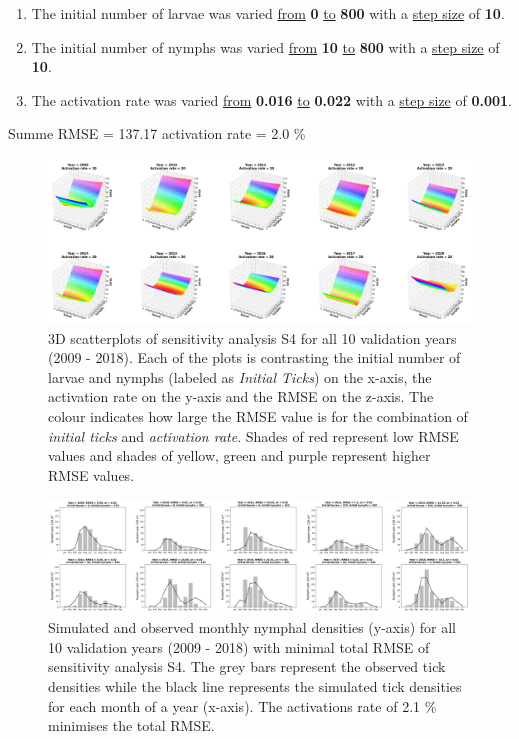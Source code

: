 \documentclass[a4paper, 11pt]{scrartcl}
\begin{document}
\begin{enumerate}
\item The initial number of larvae was varied \underline{from} \textbf{0} \underline{to} \textbf{800} with a \underline{step size} of \textbf{10}.
\item The initial number of nymphs was varied \underline{from} \textbf{10} \underline{to} \textbf{800} with a \underline{step size} of \textbf{10}.
\item The activation rate was varied \underline{from} \textbf{0.016} \underline{to} \textbf{0.022} with a \underline{step size} of \textbf{0.001}.
\end{enumerate}

Summe RMSE = 137.17
activation rate = 2.0 \%

\begin{figure}[h!]
\centering
\includegraphics[width=\linewidth]{figures/independent_initial_ticks_without_beech_error.png}
\caption{3D scatterplots of sensitivity analysis S4 for all 10 validation years (2009 - 2018). Each of the plots is contrasting the initial number of larvae and nymphs
(labeled as \textit{Initial Ticks}) on the x-axis, the activation rate on the y-axis and the RMSE on the z-axis. The colour indicates how large the RMSE value is for the
combination of \textit{initial ticks} and \textit{activation rate}. Shades of red represent low RMSE values and shades of yellow, green and purple represent higher RMSE values.}
\label{fig:independent_initial_ticks_without_beech_error}
\end{figure}

\begin{figure}[h!]
\centering
\includegraphics[width=\linewidth]{figures/independent_initial_ticks_without_beech.png}
\caption{Simulated and observed monthly nymphal densities (y-axis) for all 10 validation years (2009 - 2018) with minimal total RMSE of sensitivity analysis S4. The grey bars
represent the observed tick densities while the black line represents the simulated tick densities for each month of a year (x-axis). The activations rate of 2.1 \% minimises
the total RMSE.}
\label{fig:independent_initial_ticks_without_beech}
\end{figure}
\end{document}
